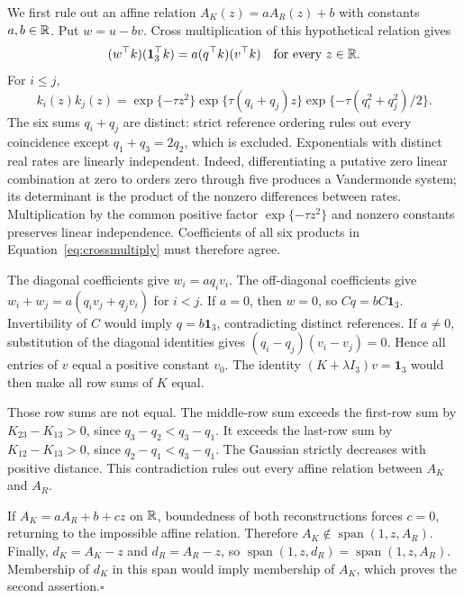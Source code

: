 We first rule out an affine relation $A_K(z)=aA_R(z)+b$ with constants $a,b\in\mathbb R$. Put $w=u-bv$. Cross multiplication of this hypothetical relation gives
\begin{equation}
 (w^\top k)(\mathbf1_3^\top k)=a(q^\top k)(v^\top k)
 \quad\hbox{for every }z\in\mathbb R.
 \label{eq:crossmultiply}
\end{equation}
For $i\leq j$,
\[
 k_i(z)k_j(z)=\exp\{-\tau z^2\}
 \exp\{\tau(q_i+q_j)z\}
 \exp\{-\tau(q_i^2+q_j^2)/2\}.
\]
The six sums $q_i+q_j$ are distinct: strict reference ordering rules out every coincidence except $q_1+q_3=2q_2$, which is excluded. Exponentials with distinct real rates are linearly independent. Indeed, differentiating a putative zero linear combination at zero to orders zero through five produces a Vandermonde system; its determinant is the product of the nonzero differences between rates. Multiplication by the common positive factor $\exp\{-\tau z^2\}$ and nonzero constants preserves linear independence. Coefficients of all six products in Equation~\eqref{eq:crossmultiply} must therefore agree.

The diagonal coefficients give $w_i=aq_i v_i$. The off-diagonal coefficients give $w_i+w_j=a(q_i v_j+q_j v_i)$ for $i<j$. If $a=0$, then $w=0$, so $Cq=bC\mathbf1_3$. Invertibility of $C$ would imply $q=b\mathbf1_3$, contradicting distinct references. If $a\ne0$, substitution of the diagonal identities gives $(q_i-q_j)(v_i-v_j)=0$. Hence all entries of $v$ equal a positive constant $v_0$. The identity $(K+\lambda I_3)v=\mathbf1_3$ would then make all row sums of $K$ equal.

Those row sums are not equal. The middle-row sum exceeds the first-row sum by $K_{23}-K_{13}>0$, since $q_3-q_2<q_3-q_1$. It exceeds the last-row sum by $K_{12}-K_{13}>0$, since $q_2-q_1<q_3-q_1$. The Gaussian strictly decreases with positive distance. This contradiction rules out every affine relation between $A_K$ and $A_R$.

If $A_K=aA_R+b+cz$ on $\mathbb R$, boundedness of both reconstructions forces $c=0$, returning to the impossible affine relation. Therefore $A_K\notin\operatorname{span}(1,z,A_R)$. Finally, $d_K=A_K-z$ and $d_R=A_R-z$, so $\operatorname{span}(1,z,d_R)=\operatorname{span}(1,z,A_R)$. Membership of $d_K$ in this span would imply membership of $A_K$, which proves the second assertion.\hfill$\square$

